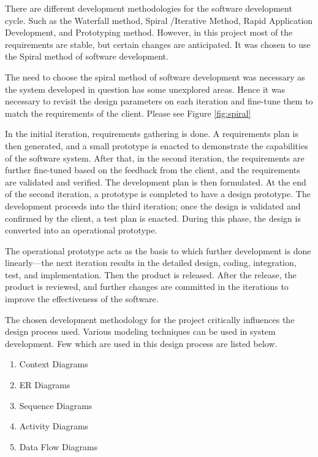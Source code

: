 \documentclass[12pt,a4paper]{report}
\begin{document}
There are different development methodologies for the software development cycle. Such as the Waterfall method, Spiral /Iterative Method, Rapid Application Development, and Prototyping method. However, in this project most of the requirements are stable, but certain changes are anticipated. It was chosen to use the Spiral method of software development.

The need to choose the spiral method of software development was necessary as the system developed in question has some unexplored areas. Hence it was necessary to revisit the design parameters on each iteration and fine-tune them to match the requirements of the client. Please see Figure \ref{fig:spiral}

In the initial iteration, requirements gathering is done. A requirements plan is then generated, and a small prototype is enacted to demonstrate the capabilities of the software system. After that, in the second iteration, the requirements are further fine-tuned based on the feedback from the client, and the requirements are validated and verified. The development plan is then formulated. At the end of the second iteration, a prototype is completed to have a design prototype. The development proceeds into the third iteration; once the design is validated and confirmed by the client, a test plan is enacted. During this phase, the design is converted into an operational prototype.

The operational prototype acts as the basis to which further development is done linearly—the next iteration results in the detailed design, coding, integration, test, and implementation. Then the product is released. After the release, the product is reviewed, and further changes are committed in the iterations to improve the effectiveness of the software.  

The chosen development methodology for the project critically influences the design process used. Various modeling techniques can be used in system development. Few which are used in this design process are listed below. 

\begin{enumerate}
	\item Context Diagrams
	\item ER Diagrams
	\item Sequence Diagrams
	\item Activity Diagrams
	\item Data Flow Diagrams
\end{enumerate}
\end{document}
